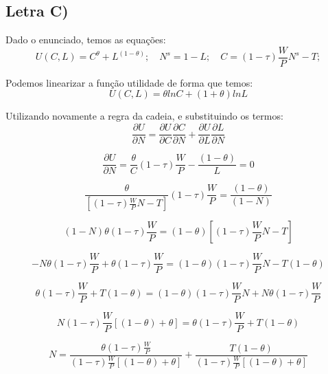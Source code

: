 \documentclass{article}
\begin{document}
\clearpage

\subsection*{Letra C)}
Dado o enunciado, temos as equações:
$$U(C, L) = C^\theta + L^{(1-\theta)}; \quad
N^{s} = 1 - L; \quad
C = (1-\tau)\frac{W}{P}N^s - T;$$

Podemos linearizar a função utilidade de forma que temos:
$$ U(C,L) = \theta ln C + (1+\theta)ln L$$

Utilizando novamente a regra da cadeia, e substituindo os termos:
\begin{equation}
\frac{\partial U}{\partial N}= \frac{\partial U}{\partial C}\frac{\partial C}{\partial N} + \frac{\partial U}{\partial L}\frac{\partial L}{\partial N}
\end{equation}

\begin{equation}
\frac{\partial U}{\partial N}= \frac{\theta}{C}(1-\tau)\frac{W}{P} - \frac{(1-\theta)}{L} = 0
\end{equation}

\begin{equation}
 \frac{\theta}{[(1-\tau)\frac{W}{P}N-T]}(1-\tau)\frac{W}{P} = \frac{(1-\theta)}{(1-N)}
\end{equation}

\begin{equation}
 (1-N)\theta(1-\tau)\frac{W}{P} = (1-\theta)[(1-\tau)\frac{W}{P}N-T]
\end{equation}

\begin{equation}
-N\theta(1-\tau)\frac{W}{P} + \theta(1-\tau)\frac{W}{P} = (1-\theta)(1-\tau)\frac{W}{P}N - T(1-\theta)
\end{equation}

\begin{equation}
\theta(1-\tau)\frac{W}{P} + T(1-\theta) = (1-\theta)(1-\tau)\frac{W}{P}N + N\theta(1-\tau)\frac{W}{P}
\end{equation}

\begin{equation}
N(1-\tau)\frac{W}{P}[(1-\theta)+\theta] = \theta(1-\tau)\frac{W}{P} + T(1-\theta)
\end{equation}

\begin{equation}
N = \frac{\theta(1-\tau)\frac{W}{P}}{(1-\tau)\frac{W}{P}[(1-\theta)+\theta]} + \frac{T(1-\theta)}{(1-\tau)\frac{W}{P}[(1-\theta)+\theta]}
\end{equation}
\end{document}
